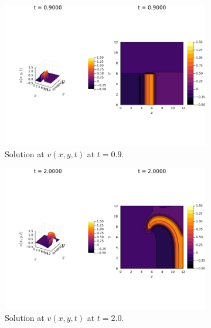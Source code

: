 \documentclass[12pt]{report}
\begin{document}
\begin{solution}
\begin{figure}[H]
    \begin{subfigure}[b]{0.45\linewidth}
        \centering
        \includegraphics[width=\linewidth]{images/6-2-90.png}
        \caption{Solution at $v(x,y,t)$ at $t=0.9$.}
        \label{6-2:a}
        \vspace{4ex}
    \end{subfigure}%
    \begin{subfigure}[b]{0.45\linewidth}
        \centering
        \includegraphics[width=\linewidth]{images/6-2-200.png}
        \caption{Solution at $v(x,y,t)$ at $t=2.0$.}
        \label{6-2:b}
        \vspace{4ex}
    \end{subfigure}
    \begin{subfigure}[b]{0.45\linewidth}

\end{subfigure}
\end{figure}
\end{solution}
\end{document}

